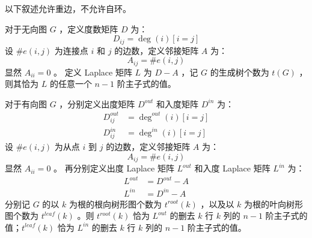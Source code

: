 以下叙述允许重边，不允许自环。

对于无向图 $G$ ，定义度数矩阵 $D$ 为：
$$
    D_{ij} = \deg(i)[i=j]
$$
设 $\#e(i,j)$ 为连接点 $i$ 和 $j$ 的边数，定义邻接矩阵 $A$ 为：
$$
    A_{ij} = \#e(i,j)
$$
显然 $A_{ii}=0$ 。
定义 Laplace 矩阵 $L$ 为 $D-A$ ，记 $G$ 的生成树个数为 $t(G)$ ，则其恰为 $L$ 的任意一个 $n-1$ 阶主子式的值。

对于有向图 $G$ ，分别定义出度矩阵 $D^{out}$ 和入度矩阵 $D^{in}$ 为：
$$
    \begin{aligned}
        D^{out}_{ij} & = \deg^{out}(i)[i=j] \\
        D^{in}_{ij}  & = \deg^{in}(i)[i=j]
    \end{aligned}
$$
设 $\#e(i,j)$ 为从点 $i$ 到 $j$ 的边数，定义邻接矩阵 $A$ 为：
$$
    A_{ij} = \#e(i,j)
$$
显然 $A_{ii}=0$ 。
再分别定义出度 Laplace 矩阵 $L^{out}$ 和入度 Laplace 矩阵 $L^{in}$ 为：
$$
    \begin{aligned}
        L^{out} & = D^{out}-A \\
        L^{in}  & = D^{in}-A
    \end{aligned}
$$
分别记 $G$ 的以 $k$ 为根的根向树形图个数为 $t^{root}(k)$ ，以及以 $k$ 为根的叶向树形图个数为 $t^{leaf}(k)$ 。则 $t^{root}(k)$ 恰为 $L^{out}$ 的删去 $k$ 行 $k$ 列的 $n-1$ 阶主子式的值；$t^{leaf}(k)$ 恰为 $L^{in}$ 的删去 $k$ 行 $k$ 列的 $n-1$ 阶主子式的值。